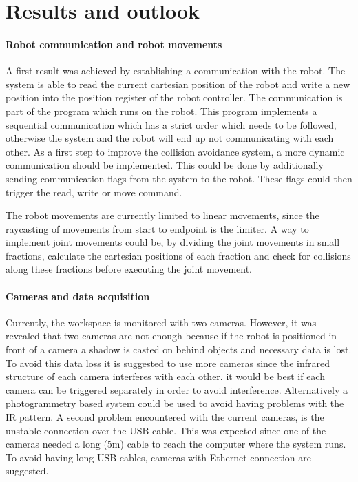 \chapter{Results and outlook}
\label{chap:results}

\subsubsection{Robot communication and robot movements} 
A first result was achieved by establishing a communication with the robot. The system is able to read the current cartesian position of the robot and write a new position into the position register of the robot controller. The communication is part of the program which runs on the robot. This program implements a sequential communication which has a strict order which needs to be followed, otherwise the system and the robot will end up not communicating with each other. As a first step to improve the collision avoidance system, a more dynamic communication should be implemented. This could be done by additionally sending communication flags from the system to the robot. These flags could then trigger the read, write or move command.

The robot movements are currently limited to linear movements, since the raycasting of movements from start to endpoint is the limiter. A way to implement joint movements could be, by dividing the joint movements in small fractions, calculate the cartesian positions of each fraction and check for collisions along these fractions before executing the joint movement.

\subsubsection{Cameras and data acquisition}
Currently, the workspace is monitored with two cameras. However, it was revealed that two cameras are not enough because if the robot is positioned in front of a camera a shadow is casted on behind objects and necessary data is lost. To avoid this data loss it is suggested to use more cameras since the infrared structure of each camera interferes with each other. it would be best if each camera can be triggered separately in order to avoid interference. Alternatively a photogrammetry based system could be used to avoid having problems with the IR pattern.  A second problem encountered with the current cameras, is the unstable connection over the USB cable. This was expected since one of the cameras needed a long (5m) cable to reach the computer where the system runs. To avoid having long USB cables, cameras with Ethernet connection are suggested. 

